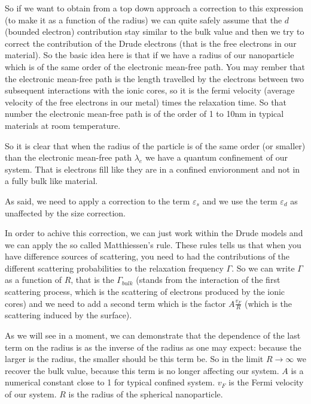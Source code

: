 \documentclass[../main/main.tex]{subfiles}
\begin{document}
So if we want to obtain from a top down approach a correction to this expression (to make it as a function of the radius) we can quite safely assume that the \( d \) (bounded electron) contribution stay similar to the bulk value and then we try to correct the contribution of the Drude electrons (that is the free electrons in our material). So the basic idea here is that if we have a radius of our nanoparticle which is of the same order of the electronic mean-free path.
You may rember that the electronic mean-free path is the length travelled by the electrons between two subsequent interactions with the ionic cores, so it is the fermi velocity (average velocity of the free electrons in our metal) times the relaxation time. So that number the electronic mean-free path is of the order of 1 to 10nm in typical materials at room temperature.

So it is clear that when the radius of the particle is of the same order (or smaller) than the electronic mean-free path \( \lambda _e \) we have a quantum confinement of our system.
That is electrons fill like they are in a confined envioronment and not in a fully bulk like material.

As said, we need to apply a correction to the term \( \varepsilon _s \) and we use the term \( \varepsilon _d \) as unaffected by the size correction.

In order to achive this correction, we can just work within the Drude models and we can apply the so called Matthiessen's rule. These rules tells us that when you have difference sources of scattering, you need to had the contributions of the different scattering probabilities to the relaxation frequency \( \Gamma  \). So we can write \( \Gamma  \) as a function of \( R \), that is the \( \Gamma_{bulk}   \) (stands from the interaction of the first scattering process, which is the scattering of electrons produced by the ionic cores) and we need to add a second term which is the factor \( A \frac{v_F}{R} \) (which is the scattering induced by the surface).

As we will see in a moment, we can demonstrate that the dependence of the last term on the radius is as the inverse of the radius as one may expect: because the larger is the radius, the smaller should be this term be. So in the limit \( R \rightarrow \infty  \) we recover the bulk value, because this term is no longer affecting our system. \( A \) is a numerical constant close to 1 for typical confined system. \( v_F \) is the Fermi velocity of our system.  \( R \) is the radius of the spherical nanoparticle.
\end{document}
